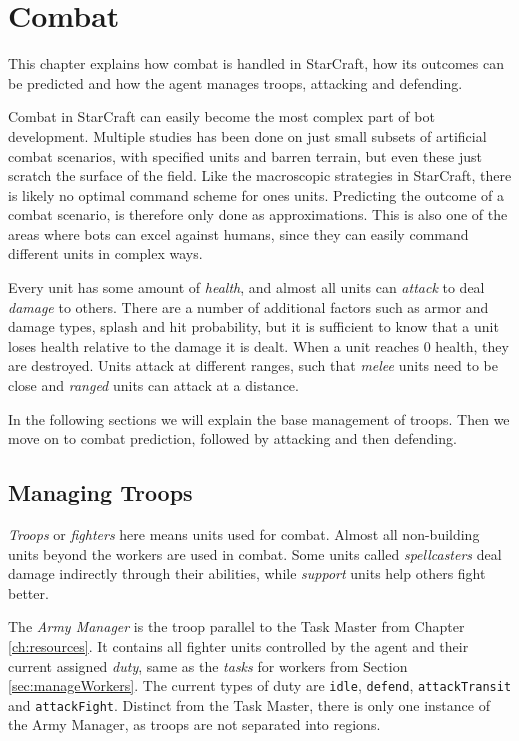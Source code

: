 \chapter{Combat}
\label{ch:combat}
This chapter explains how combat is handled in StarCraft, how its outcomes can be predicted and how the agent manages troops, attacking and defending.

Combat in StarCraft can easily become the most complex part of bot development. Multiple studies has been done on just small subsets of artificial combat scenarios, with specified units and barren terrain, but even these just scratch the surface of the field. Like the macroscopic strategies in StarCraft, there is likely no optimal command scheme for ones units. Predicting the outcome of a combat scenario, is therefore only done as approximations. This is also one of the areas where bots can excel against humans, since they can easily command different units in complex ways.

Every unit has some amount of \emph{health}, and almost all units can \emph{attack} to deal \emph{damage} to others. There are a number of additional factors such as armor and damage types, splash and hit probability, but it is sufficient to know that a unit loses health relative to the damage it is dealt. When a unit reaches 0 health, they are destroyed. Units attack at different ranges, such that \emph{melee} units need to be close and \emph{ranged} units can attack at a distance.

In the following sections we will explain the base management of troops. Then we move on to combat prediction, followed by attacking and then defending.

\section{Managing Troops}
\emph{Troops} or \emph{fighters} here means units used for combat. Almost all non-building units beyond the workers are used in combat. Some units called \emph{spellcasters} deal damage indirectly through their abilities, while \emph{support} units help others fight better.

The \emph{Army Manager} is the troop parallel to the Task Master from Chapter \ref{ch:resources}. It contains all fighter units controlled by the agent and their current assigned \emph{duty}, same as the \emph{tasks} for workers from Section \ref{sec:manageWorkers}. The current types of duty are \texttt{idle}, \texttt{defend}, \texttt{attackTransit} and \texttt{attackFight}. Distinct from the Task Master, there is only one instance of the Army Manager, as troops are not separated into regions.

